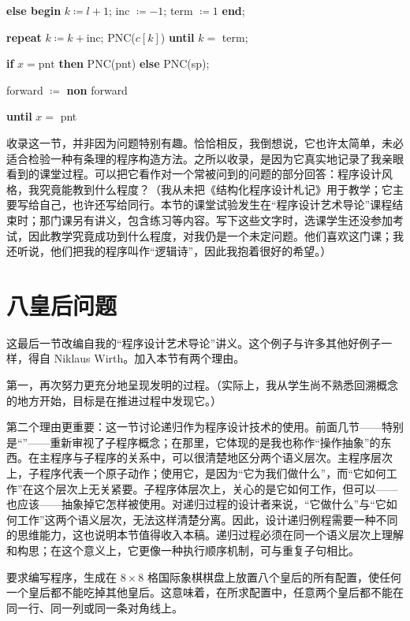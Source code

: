 \quad \quad\quad \textbf{else begin} $k\coloneq l + 1$; inc $\coloneq -1$; term $\coloneq 1$ \textbf{end};

\quad \quad \textbf{repeat} $k\coloneq k + \text{inc}$; PNC($c[k]$) \textbf{until} $k =$ term;

\quad \quad \textbf{if} $x = \text{pnt}$ \textbf{then} PNC(pnt) \textbf{else} PNC(sp);

\quad \quad forward $\coloneq$ \textbf{non} forward

\quad \textbf{until} $x =$ pnt

收录这一节，并非因为问题特别有趣。恰恰相反，我倒想说，它也许太简单，未必适合检验一种有条理的程序构造方法。之所以收录，是因为它真实地记录了我亲眼看到的课堂过程。可以把它看作对一个常被问到的问题的部分回答：程序设计风格，我究竟能教到什么程度？（我从未把《结构化程序设计札记》用于教学；它主要写给自己，也许还写给同行。本节的课堂试验发生在“程序设计艺术导论”课程结束时；那门课另有讲义，包含练习等内容。写下这些文字时，选课学生还没参加考试，因此教学究竟成功到什么程度，对我仍是一个未定问题。他们喜欢这门课；我还听说，他们把我的程序叫作“逻辑诗”，因此我抱着很好的希望。）

\section[八皇后问题]{八皇后问题}

这最后一节改编自我的“程序设计艺术导论”讲义。这个例子与许多其他好例子一样，得自 Niklaus Wirth。加入本节有两个理由。

第一，再次努力更充分地呈现发明的过程。（实际上，我从学生尚不熟悉回溯概念的地方开始，目标是在推进过程中发现它。）

第二个理由更重要：这一节讨论递归作为程序设计技术的使用。前面几节——特别是“”——重新审视了子程序概念；在那里，它体现的是我也称作“操作抽象”的东西。在主程序与子程序的关系中，可以很清楚地区分两个语义层次。主程序层次上，子程序代表一个原子动作；使用它，是因为“它为我们做什么”，而“它如何工作”在这个层次上无关紧要。子程序体层次上，关心的是它如何工作，但可以——也应该——抽象掉它怎样被使用。对递归过程的设计者来说，“它做什么”与“它如何工作”这两个语义层次，无法这样清楚分离。因此，设计递归例程需要一种不同的思维能力，这也说明本节值得收入本稿。递归过程必须在同一个语义层次上理解和构思；在这个意义上，它更像一种执行顺序机制，可与重复子句相比。

要求编写程序，生成在 $8\times 8$ 格国际象棋棋盘上放置八个皇后的所有配置，使任何一个皇后都不能吃掉其他皇后。这意味着，在所求配置中，任意两个皇后都不能在同一行、同一列或同一条对角线上。

